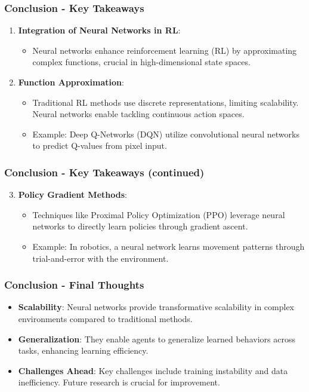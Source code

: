 \documentclass[aspectratio=169]{beamer}
\begin{document}
\begin{frame}[fragile]
    \frametitle{Conclusion - Key Takeaways}
    \begin{enumerate}
        \item \textbf{Integration of Neural Networks in RL}:
        \begin{itemize}
            \item Neural networks enhance reinforcement learning (RL) by approximating complex functions, crucial in high-dimensional state spaces.
        \end{itemize}
        \item \textbf{Function Approximation}:
        \begin{itemize}
            \item Traditional RL methods use discrete representations, limiting scalability. Neural networks enable tackling continuous action spaces.
            \item Example: Deep Q-Networks (DQN) utilize convolutional neural networks to predict Q-values from pixel input.
        \end{itemize}
    \end{enumerate}
\end{frame}

\begin{frame}[fragile]
    \frametitle{Conclusion - Key Takeaways (continued)}
    \begin{enumerate}
        \setcounter{enumi}{2}
        \item \textbf{Policy Gradient Methods}:
        \begin{itemize}
            \item Techniques like Proximal Policy Optimization (PPO) leverage neural networks to directly learn policies through gradient ascent.
            \item Example: In robotics, a neural network learns movement patterns through trial-and-error with the environment.
        \end{itemize}
    \end{enumerate}
\end{frame}

\begin{frame}[fragile]
    \frametitle{Conclusion - Final Thoughts}
    \begin{itemize}
        \item \textbf{Scalability}: Neural networks provide transformative scalability in complex environments compared to traditional methods.
        \item \textbf{Generalization}: They enable agents to generalize learned behaviors across tasks, enhancing learning efficiency.
        \item \textbf{Challenges Ahead}: Key challenges include training instability and data inefficiency. Future research is crucial for improvement.
    \end{itemize}
\end{frame}
\end{document}
